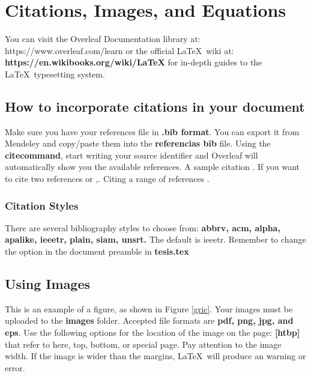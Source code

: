 
\chapter{Citations, Images, and Equations}  

\noindent You can visit the Overleaf Documentation library at: https://www.overleaf.com/learn or the official \LaTeX\ wiki at: \textbf{https://en.wikibooks.org/wiki/LaTeX} for in-depth guides to the \LaTeX\ typesetting system.

\section{How to incorporate citations in your document}


\noindent Make sure you have your references file in \textbf{.bib format}. You can export it from Mendeley and copy/paste them into the \textbf{referencias bib} file. Using the \textbf{citecommand}, start writing your source identifier and Overleaf will automatically show you the available references. A sample citation \cite{dirac}. If you want to cite two references \cite{einstein,knuth-fa} or \cite{einstein},\cite{knuth-fa}. Citing a range of references \cite{einstein,knuth-fa,radiation2}.


\subsection{Citation Styles}
\noindent There are several bibliography styles to choose from: \textbf{abbrv, acm, alpha, apalike, ieeetr, plain, siam, unsrt.} The default is ieeetr. Remember to change the option in the document preamble in \textbf{tesis.tex} %


\section{Using Images}





\noindent This is an example of a figure, as shown in Figure \ref{gric}. Your images must be uploaded to the \textbf{images} folder. Accepted file formats are \textbf{pdf, png, jpg, and eps}. Use the following options for the location of the image on the page: \textbf{[htbp]} that refer to here, top, bottom, or special page. Pay attention to the image width. If the image is wider than the margins, \LaTeX\ will produce an warning or error.


